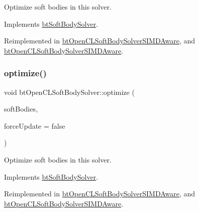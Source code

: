Optimize soft bodies in this solver. 

Implements \hyperlink{classbtSoftBodySolver_af07da1ec6f11e7873bc5fafef426fcd3}{bt\+Soft\+Body\+Solver}.



Reimplemented in \hyperlink{classbtOpenCLSoftBodySolverSIMDAware_ad1052da1c0e61eac7d9fe1df618c150c}{bt\+Open\+C\+L\+Soft\+Body\+Solver\+S\+I\+M\+D\+Aware}, and \hyperlink{classbtOpenCLSoftBodySolverSIMDAware_a5b9fb1bbf50012e83d8e2c38c5fc2afb}{bt\+Open\+C\+L\+Soft\+Body\+Solver\+S\+I\+M\+D\+Aware}.

\mbox{\label{classbtOpenCLSoftBodySolver_a1340686f32dcdd4e8f36a56788a2e51c}} 
\subsubsection{\texorpdfstring{optimize()}{optimize()}\hspace{0.1cm}{\footnotesize\ttfamily [2/2]}}
{\footnotesize\ttfamily void bt\+Open\+C\+L\+Soft\+Body\+Solver\+::optimize (\begin{DoxyParamCaption}\item[{\hyperlink{classbtAlignedObjectArray}{bt\+Aligned\+Object\+Array}$<$ \hyperlink{classbtSoftBody}{bt\+Soft\+Body} $\ast$ $>$ \&}]{soft\+Bodies,  }\item[{bool}]{force\+Update = {\ttfamily false} }\end{DoxyParamCaption})\hspace{0.3cm}{\ttfamily [virtual]}}

Optimize soft bodies in this solver. 

Implements \hyperlink{classbtSoftBodySolver_af07da1ec6f11e7873bc5fafef426fcd3}{bt\+Soft\+Body\+Solver}.



Reimplemented in \hyperlink{classbtOpenCLSoftBodySolverSIMDAware_ad1052da1c0e61eac7d9fe1df618c150c}{bt\+Open\+C\+L\+Soft\+Body\+Solver\+S\+I\+M\+D\+Aware}, and \hyperlink{classbtOpenCLSoftBodySolverSIMDAware_a5b9fb1bbf50012e83d8e2c38c5fc2afb}{bt\+Open\+C\+L\+Soft\+Body\+Solver\+S\+I\+M\+D\+Aware}.

\mbox{\label{classbtOpenCLSoftBodySolver_ab48872d1de7b5b960d462c71d36ee92d}} 
